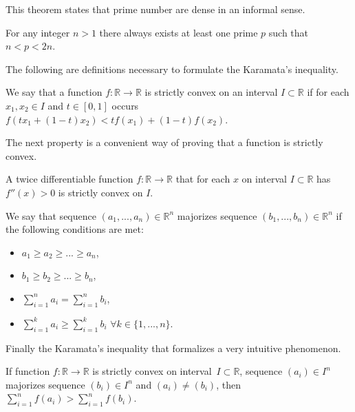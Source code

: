 This theorem states that prime number are dense in an informal sense.

\begin{thm}
For any integer $n>1$ there always exists at least one prime $p$ such that $n < p < 2n$.
\end{thm}


The following are definitions necessary to formulate the Karamata's inequality.

\begin{defn}
We say that a function $f:\mathbb{R}\rightarrow\mathbb{R}$ is strictly convex on an interval $I \subset \mathbb{R}$
if for each $x_1, x_2 \in I$ and $t \in [0,1]$ occurs $f(t x_1 + (1-t) x_2) < tf(x_1) + (1-t)f(x_2)$.
\end{defn}

The next property is a convenient way of proving that a function is strictly convex.

\begin{prp}
A twice differentiable function $f:\mathbb{R}\rightarrow\mathbb{R}$
that for each $x$ on interval $I \subset \mathbb{R}$ has $f''(x) > 0$
is strictly convex on $I$.
\end{prp}

\begin{defn}[majorization]
We say that sequence $(a_1, ..., a_n) \in \mathbb{R}^n$ majorizes sequence $(b_1, ..., b_n) \in \mathbb{R}^n$
if the following conditions are met:
\begin{itemize}
	\item $a_1 \geq a_2 \geq ... \geq a_n$,
	\item $b_1 \geq b_2 \geq ... \geq b_n$,
	\item $\sum_{i=1}^n a_i = \sum_{i=1}^n b_i$,
	\item $\sum_{i=1}^k a_i \geq \sum_{i=1}^k b_i$ $\forall k \in \{ 1, ..., n\}$.
\end{itemize}
\end{defn}

Finally the Karamata's inequality that formalizes a very intuitive phenomenon.

\begin{thm} \label{thm:Kar}
If function $f:\mathbb{R}\rightarrow\mathbb{R}$ is strictly convex on interval~$I \subset \mathbb{R}$,
sequence $(a_i) \in I^n$ majorizes sequence $(b_i) \in I^n$ and $(a_i) \neq (b_i)$, then
$\sum_{i=1}^n f(a_i) > \sum_{i=1}^n f(b_i)$.
\end{thm}


